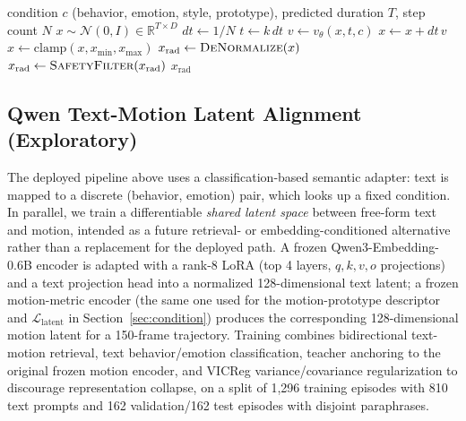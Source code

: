 \documentclass[conference]{IEEEtran}
\begin{document}
\begin{algorithm}[t]
\caption{Inference-time Euler sampling}
\label{alg:inference}
\begin{algorithmic}[1]
\Require condition $c$ (behavior, emotion, style, prototype), predicted
duration $T$, step count $N$
\State $x \sim \mathcal N(0,I) \in \mathbb R^{T\times D}$ 
\State $dt \leftarrow 1/N$
  \State $t \leftarrow k\,dt$
  \State $v \leftarrow v_\theta(x, t, c)$ 
  \State $x \leftarrow x + dt\,v$
  \State $x \leftarrow \mathrm{clamp}(x, x_{\min}, x_{\max})$ 
\EndFor
\State $x_{\text{rad}} \leftarrow \textsc{DeNormalize}(x)$
\State $x_{\text{rad}} \leftarrow \textsc{SafetyFilter}(x_{\text{rad}})$ 
\State \Return $x_{\text{rad}}$
\end{algorithmic}
\end{algorithm}

\subsection{Qwen Text-Motion Latent Alignment (Exploratory)}
\label{sec:qwen-latent}

The deployed pipeline above uses a classification-based semantic
adapter: text is mapped to a discrete (behavior, emotion) pair, which
looks up a fixed condition. In parallel, we train a differentiable
\emph{shared latent space} between free-form text and motion, intended
as a future retrieval- or embedding-conditioned alternative rather than
a replacement for the deployed path. A frozen Qwen3-Embedding-0.6B
encoder is adapted with a rank-8 LoRA (top 4 layers, $q,k,v,o$
projections) and a text projection head into a normalized
128-dimensional text latent; a frozen motion-metric encoder (the same
one used for the motion-prototype descriptor and $\mathcal L_{\text{latent}}$
in Section~\ref{sec:condition}) produces the corresponding 128-dimensional
motion latent for a 150-frame trajectory. Training combines
bidirectional text-motion retrieval, text behavior/emotion
classification, teacher anchoring to the original frozen motion
encoder, and VICReg variance/covariance regularization to discourage
representation collapse, on a split of 1{,}296 training episodes with
810 text prompts and 162 validation/162 test episodes with disjoint
paraphrases.
\end{document}
